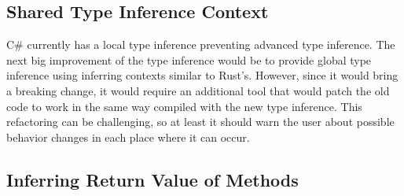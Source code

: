\subsection{Shared Type Inference Context}

C\# currently has a local type inference preventing advanced type inference. 
The next big improvement of the type inference would be to provide global type inference using inferring contexts similar to Rust's. 
However, since it would bring a breaking change, it would require an additional tool that would patch the old code to work in the same way compiled with the new type inference. 
This refactoring can be challenging, so at least it should warn the user about possible behavior changes in each place where it can occur.

\subsection{Inferring Return Value of Methods}

